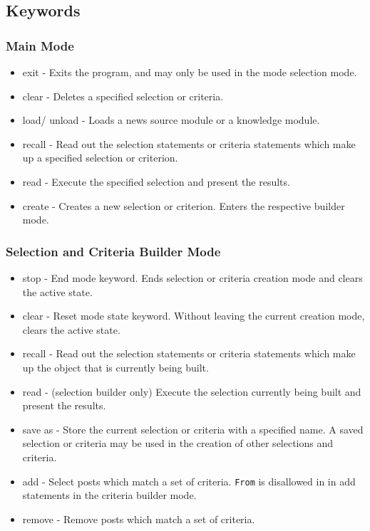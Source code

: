 \subsection{Keywords}

\subsubsection{Main Mode}
\begin{itemize}
\item exit - Exits the program, and may only be used in the mode selection mode.
\item clear - Deletes a specified selection or criteria.
\item load/ unload - Loads a news source module or a knowledge module.
\item recall - Read out the selection statements or criteria statements which make up a specified selection or criterion.
\item read - Execute the specified selection and present the results.
\item create - Creates a new selection or criterion. Enters the respective builder mode.
\end{itemize}

\subsubsection{Selection and Criteria Builder Mode}
\begin{itemize}
\item stop - End mode keyword. Ends selection or criteria creation mode and clears the active state.
\item clear - Reset mode state keyword. Without leaving the current creation mode, clears the active state.
\item recall - Read out the selection statements or criteria statements which make up the object that is currently being built.
\item read - (selection builder only) Execute the selection currently being built and present the results.
\item save as - Store the current selection or criteria with a specified name. A saved selection or criteria may be used in the creation of other selections and criteria.
\item add - Select posts which match a set of criteria. \texttt{From} is disallowed in in add statements in the criteria builder mode.
\item remove - Remove posts which match a set of criteria.
\end{itemize}
